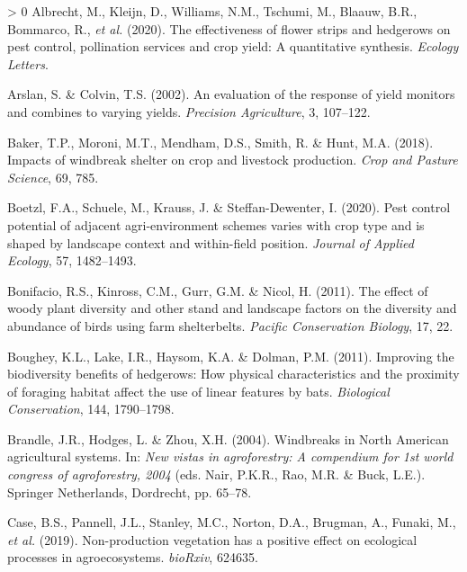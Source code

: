 \documentclass[]{elsarticle} %
\newlength{\cslhangindent}
\newenvironment{CSLReferences}[3] %
 {%
  \setlength{\parindent}{0pt}
  \ifodd #1 \everypar{\setlength{\hangindent}{\cslhangindent}}\ignorespaces\fi
  \ifnum #2 > 0
  \setlength{\parskip}{#2\baselineskip}
  \fi
 }%
 {}
\begin{document}
\hypertarget{refs}{}
\begin{CSLReferences}{1}{0}
\leavevmode\hypertarget{ref-albrecht2020}{}%
Albrecht, M., Kleijn, D., Williams, N.M., Tschumi, M., Blaauw, B.R., Bommarco, R., \emph{et al.} (2020). The effectiveness of flower strips and hedgerows on pest control, pollination services and crop yield: A quantitative synthesis. \emph{Ecology Letters}.

\leavevmode\hypertarget{ref-arslan2002}{}%
Arslan, S. \& Colvin, T.S. (2002). An evaluation of the response of yield monitors and combines to varying yields. \emph{Precision Agriculture}, 3, 107--122.

\leavevmode\hypertarget{ref-baker2018}{}%
Baker, T.P., Moroni, M.T., Mendham, D.S., Smith, R. \& Hunt, M.A. (2018). Impacts of windbreak shelter on crop and livestock production. \emph{Crop and Pasture Science}, 69, 785.

\leavevmode\hypertarget{ref-boetzl2020}{}%
Boetzl, F.A., Schuele, M., Krauss, J. \& Steffan-Dewenter, I. (2020). Pest control potential of adjacent agri-environment schemes varies with crop type and is shaped by landscape context and within-field position. \emph{Journal of Applied Ecology}, 57, 1482--1493.

\leavevmode\hypertarget{ref-bonifacio2011}{}%
Bonifacio, R.S., Kinross, C.M., Gurr, G.M. \& Nicol, H. (2011). The effect of woody plant diversity and other stand and landscape factors on the diversity and abundance of birds using farm shelterbelts. \emph{Pacific Conservation Biology}, 17, 22.

\leavevmode\hypertarget{ref-boughey2011}{}%
Boughey, K.L., Lake, I.R., Haysom, K.A. \& Dolman, P.M. (2011). Improving the biodiversity benefits of hedgerows: How physical characteristics and the proximity of foraging habitat affect the use of linear features by bats. \emph{Biological Conservation}, 144, 1790--1798.

\leavevmode\hypertarget{ref-brandle2004}{}%
Brandle, J.R., Hodges, L. \& Zhou, X.H. (2004). Windbreaks in {North American} agricultural systems. In: \emph{New vistas in agroforestry: A compendium for 1st world congress of agroforestry, 2004} (eds. Nair, P.K.R., Rao, M.R. \& Buck, L.E.). Springer Netherlands, Dordrecht, pp. 65--78.

\leavevmode\hypertarget{ref-case2019}{}%
Case, B.S., Pannell, J.L., Stanley, M.C., Norton, D.A., Brugman, A., Funaki, M., \emph{et al.} (2019). Non-production vegetation has a positive effect on ecological processes in agroecosystems. \emph{bioRxiv}, 624635.


\end{CSLReferences}
\end{document}
